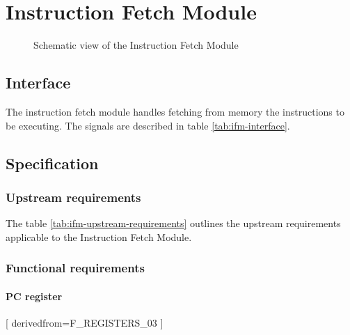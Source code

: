 \section{Instruction Fetch Module}

\begin{figure}[h!]
    \centering
    
    \caption{Schematic view of the Instruction Fetch Module}
    \label{fig:ifm}
\end{figure}

\subsection{Interface}

\begin{content}
The instruction fetch module handles fetching from memory the instructions to be executing. The signals are described in table \ref{tab:ifm-interface}. 
\end{content}



\subsection{Specification}

\subsubsection{Upstream requirements}

The table \ref{tab:ifm-upstream-requirements} outlines the upstream requirements applicable to the Instruction Fetch Module.



\subsubsection{Functional requirements}

\paragraph{PC register}

[
  derivedfrom=F\_REGISTERS\_03
]


